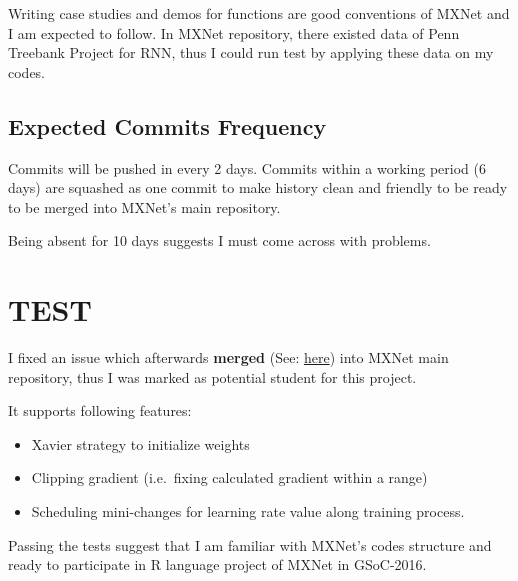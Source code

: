 \documentclass[]{article}
\providecommand{\tightlist}{%
  \setlength{\itemsep}{0pt}\setlength{\parskip}{0pt}}
\begin{document}
Writing case studies and demos for functions are good conventions of
MXNet and I am expected to follow. In MXNet repository, there existed
data of Penn Treebank Project for RNN, thus I could run test by applying
these data on my codes.

\subsection{Expected Commits
Frequency}\label{expected-commits-frequency}

Commits will be pushed in every 2 days. Commits within a working period
(6 days) are squashed as one commit to make history clean and friendly
to be ready to be merged into MXNet's main repository.

Being absent for 10 days suggests I must come across with problems.

\section{TEST}\label{test}

I fixed an issue which afterwards \textbf{merged} (See:
\href{https://github.com/dmlc/mxnet/pull/1554}{here}) into MXNet main
repository, thus I was marked as potential student for this project.

It supports following features:

\begin{itemize}
\tightlist
\item
  Xavier strategy to initialize weights
\item
  Clipping gradient (i.e.~fixing calculated gradient within a range)
\item
  Scheduling mini-changes for learning rate value along training
  process.
\end{itemize}

Passing the tests suggest that I am familiar with MXNet's codes
structure and ready to participate in R language project of MXNet in
GSoC-2016.
\end{document}
